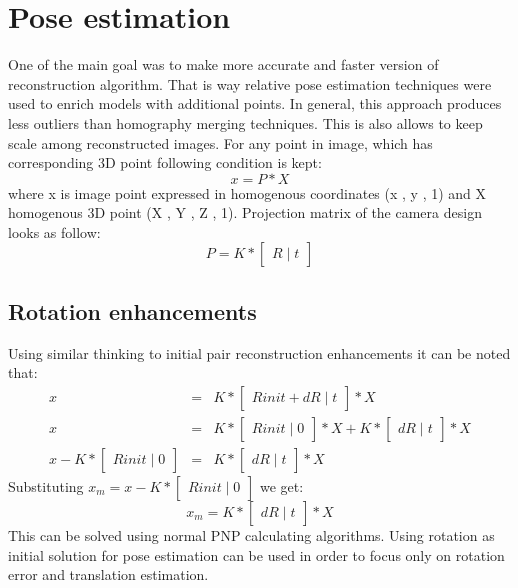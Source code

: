 \section{Pose estimation}
One of the main goal was to make more accurate and faster version of reconstruction algorithm. That is way relative pose estimation techniques were used to enrich models with additional points. In general, this approach produces less outliers than homography merging techniques. This is also allows to keep scale among reconstructed images. For any point in image, which has corresponding 3D point following condition is kept:
\begin{equation} \label{eq:projectionEquation}
 x = P * X
\end{equation}
where x is image point expressed in homogenous coordinates (x , y , 1) and X homogenous 3D  point (X , Y , Z , 1). 
Projection matrix of the camera design looks as follow: 
\begin{equation} \label{eq:projectionEquation}
 P = K * \begin{bmatrix}R\mid t\end{bmatrix}
\end{equation}
\subsection{Rotation enhancements}
Using similar thinking to initial pair reconstruction enhancements it can be noted that:
\begin{equation} \label{eq:projectionRotError1}
\begin{array}{rcl}
 x & = & K * \begin{bmatrix}Rinit + dR\mid t\end{bmatrix} * X \\
 x & = & K * \begin{bmatrix}Rinit\mid 0\end{bmatrix} * X + K * \begin{bmatrix}dR\mid t\end{bmatrix} * X \\
 x - K * \begin{bmatrix}Rinit\mid 0\end{bmatrix} & = & K * \begin{bmatrix}dR\mid t\end{bmatrix} * X
\end{array}
\end{equation}
Substituting $x_{m} = x - K * \begin{bmatrix}Rinit\mid 0\end{bmatrix}$ we get: 
\begin{equation} \label{eq:projectionRotError2}
x_{m} = K * \begin{bmatrix}dR\mid t\end{bmatrix} * X
\end{equation}
This can be solved using normal PNP calculating algorithms. Using rotation as initial solution for pose estimation can be used in order to focus only on rotation error and translation estimation.
